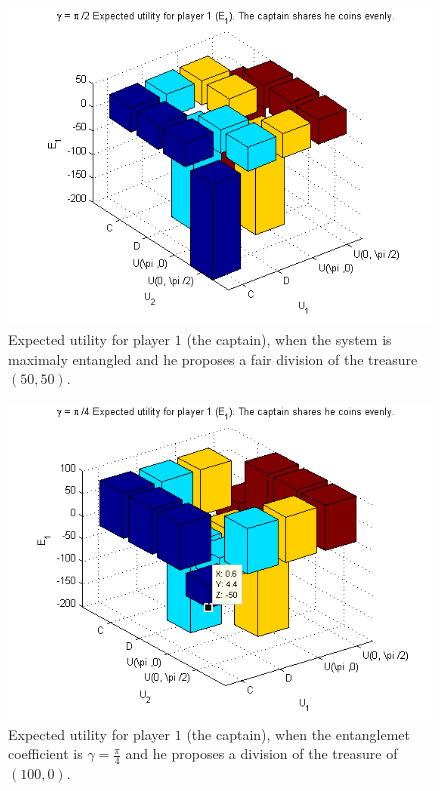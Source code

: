 \documentclass[10pt]{llncs}
\begin{document}
\begin{figure}[h!]
\centering 
\includegraphics[scale=0.50]{Figures/1.5qubit/poorcaptain.png}
\caption{Expected utility for player $1$ (the captain), when the system is maximaly entangled and he proposes a fair division of the treasure $(50,50)$.}
\label{fig:pg_2players_99_0_1:33}
\end{figure}


\begin{figure}[h!]
\centering 
\includegraphics[scale=0.50]{Figures/1.5qubit/piadividirpor4.png}
\caption{Expected utility for player $1$ (the captain), when the entanglemet coefficient is $\gamma=\frac{\pi}{4}$ and he proposes a division of the treasure of $(100,0)$.}
\label{fig:pg_2players_99_0_1:33jesus}
\end{figure}
\end{document}
